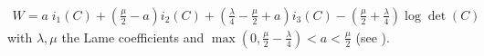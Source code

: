 \documentclass[a4paper,11pt,english]{sphinxmanual}
\begin{document}
\subsubsection{}
\label{\detokenize{userdoc/model_nonlinear_elasticity:ciarlet-geymonat-law}}\begin{equation*}
\begin{split}{W} = a\; i_1(C) + (\frac{\mu}{2} - a)i_2(C) + (\frac{\lambda}{4} - \frac{\mu}{2} + a)i_3(C) - (\frac{\mu}{2}+\frac{\lambda}{4})\log \det(C)\end{split}
\end{equation*}
with  \(\lambda, \mu\) the Lame coefficients and \(\max(0,\frac{\mu}{2}-\frac{\lambda}{4})<a<\frac{\mu}{2}\) (see ).
\end{document}
